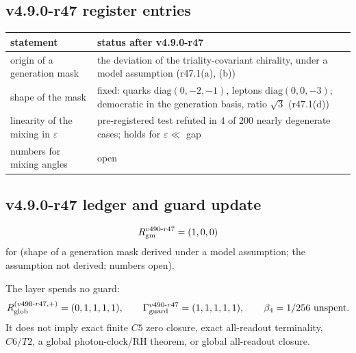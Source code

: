 \subsection*{v4.9.0-r47 register entries}
\label{subsec:v490-r47-register}

\begin{center}
\small
\begin{tabular}{@{}>{\raggedright\arraybackslash}p{}>{\raggedright\arraybackslash}p{}@{}}
\toprule
statement & status after v4.9.0-r47\\
\midrule
origin of a generation mask & the deviation of the triality-covariant chirality, under a model assumption (r47.1(a), (b))\\
shape of the mask & fixed: quarks \(\mathrm{diag}(0,-2,-1)\), leptons \(\mathrm{diag}(0,0,-3)\); democratic in the generation basis, ratio \(\sqrt3\) (r47.1(d))\\
linearity of the mixing in \(\varepsilon\) & pre-registered test refuted in \(4\) of \(200\) nearly degenerate cases; holds for \(\varepsilon\ll\) gap\\
numbers for mixing angles & open\\
\bottomrule
\end{tabular}
\end{center}

\subsection*{v4.9.0-r47 ledger and guard update}
\label{subsec:v490-r47-ledger-guard}

\[
R_{\rm gm}^{v490\text{-}r47}=(1,0,0)
\]
for (shape of a generation mask derived under a model assumption; the assumption not derived; numbers open).

The layer spends no guard:
\[
R_{\rm glob}^{(v490\text{-}r47,+)}=(0,1,1,1,1),
\qquad
\Gamma_{\rm guard}^{v490\text{-}r47}=(1,1,1,1,1),
\qquad
\beta_4=1/256\ \text{unspent}.
\]
It does not imply exact finite \(C5\) zero closure, exact all-readout terminality,
\(C6/T2\), a global photon-clock/RH theorem, or global all-readout closure.
